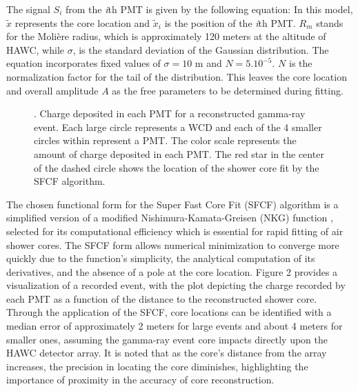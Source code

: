 The signal $S_i$ from the \textit{i}th PMT is given by the following equation:
\showercore
In this model, $\tilde{x}$ represents the core location and $\tilde{x}_i$ is the position of the \textit{i}th PMT.
$R_m$ stands for the Molière radius, which is approximately 120 meters at the altitude of HAWC, while $\sigma$, is the standard deviation of the Gaussian distribution.
The equation incorporates fixed values of $\sigma = 10$ m and $N=5.10^{-5}$.
$N$ is the normalization factor for the tail of the distribution.
This leaves the core location and overall amplitude $A$ as the free parameters to be determined during fitting.

\begin{figure}
    \caption{. Charge deposited in each PMT for a reconstructed gamma-ray event. Each large circle represents a WCD and each of the 4 smaller circles within represent a PMT. The color scale represents the amount of charge deposited in each PMT. The red star in the center of the dashed circle shows the location of the shower core fit by the SFCF algorithm. \cite{Abeysekara_2017}}
    \label{fig:core_fitter}
\end{figure}

The chosen functional form for the Super Fast Core Fit (SFCF) algorithm is a simplified version of a modified Nishimura-Kamata-Greisen (NKG) function \cite{cosmic_ray_shape}, selected for its computational efficiency which is essential for rapid fitting of air shower cores.
The SFCF form allows numerical minimization to converge more quickly due to the function's simplicity, the analytical computation of its derivatives, and the absence of a pole at the core location.
Figure 2 provides a visualization of a recorded event, with the plot depicting the charge recorded by each PMT as a function of the distance to the reconstructed shower core.
Through the application of the SFCF, core locations can be identified with a median error of approximately 2 meters for large events and about 4 meters for smaller ones, assuming the gamma-ray event core impacts directly upon the HAWC detector array.
It is noted that as the core's distance from the array increases, the precision in locating the core diminishes, highlighting the importance of proximity in the accuracy of core reconstruction.


